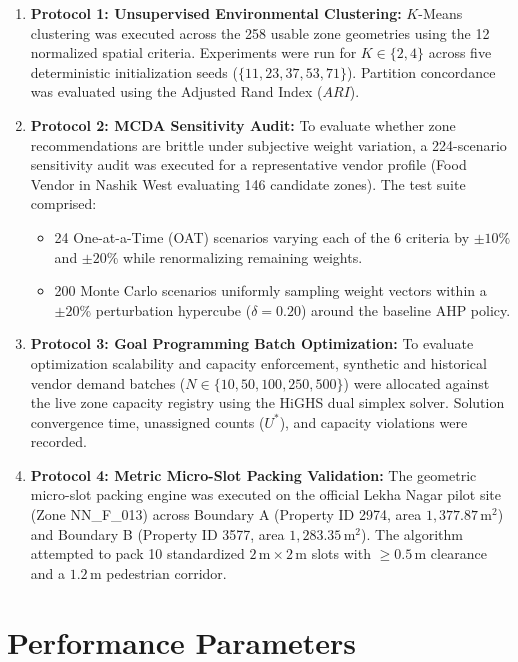 \begin{enumerate}
    \item \textbf{Protocol 1: Unsupervised Environmental Clustering:}
    $K$-Means clustering was executed across the 258 usable zone geometries using the 12 normalized spatial criteria. Experiments were run for $K \in \{2, 4\}$ across five deterministic initialization seeds ($\{11, 23, 37, 53, 71\}$). Partition concordance was evaluated using the Adjusted Rand Index ($ARI$).
    
    \item \textbf{Protocol 2: MCDA Sensitivity Audit:}
    To evaluate whether zone recommendations are brittle under subjective weight variation, a 224-scenario sensitivity audit was executed for a representative vendor profile (Food Vendor in Nashik West evaluating 146 candidate zones). The test suite comprised:
    \begin{itemize}
        \item 24 One-at-a-Time (OAT) scenarios varying each of the 6 criteria by $\pm 10\%$ and $\pm 20\%$ while renormalizing remaining weights.
        \item 200 Monte Carlo scenarios uniformly sampling weight vectors within a $\pm 20\%$ perturbation hypercube ($\delta = 0.20$) around the baseline AHP policy.
    \end{itemize}
    
    \item \textbf{Protocol 3: Goal Programming Batch Optimization:}
    To evaluate optimization scalability and capacity enforcement, synthetic and historical vendor demand batches ($N \in \{10, 50, 100, 250, 500\}$) were allocated against the live zone capacity registry using the HiGHS dual simplex solver. Solution convergence time, unassigned counts ($U^*$), and capacity violations were recorded.
    
    \item \textbf{Protocol 4: Metric Micro-Slot Packing Validation:}
    The geometric micro-slot packing engine was executed on the official Lekha Nagar pilot site (Zone NN\_F\_013) across Boundary A (Property ID 2974, area $1,377.87\,\text{m}^2$) and Boundary B (Property ID 3577, area $1,283.35\,\text{m}^2$). The algorithm attempted to pack 10 standardized $2\,\text{m} \times 2\,\text{m}$ slots with $\ge 0.5\,\text{m}$ clearance and a $1.2\,\text{m}$ pedestrian corridor.
\end{enumerate}

\section{Performance Parameters}
\label{sec:performance_parameters}

